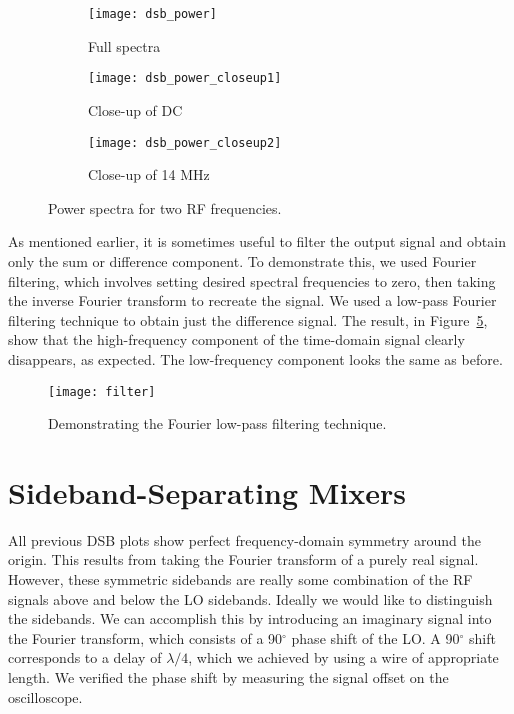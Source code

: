 \documentclass[12pt]{article}
\newcommand{\degree}{\ensuremath{^\circ} }
\begin{document}
\begin{figure}[h]
    \centering
    \begin{subfigure}[b]{0.3\textwidth}
        \texttt{[image: dsb\_power]}
        \caption{Full spectra}
        \label{fig:dsb_power}
    \end{subfigure}
    \quad
    \begin{subfigure}[b]{0.3\textwidth}
        \texttt{[image: dsb\_power\_closeup1]}
        \caption{Close-up of DC}
        \label{fig:dsb_power_closeup1}
    \end{subfigure}
    \begin{subfigure}[b]{0.3\textwidth}
        \texttt{[image: dsb\_power\_closeup2]}
        \caption{Close-up of 14 MHz}
        \label{fig:dsb_power_closeup2}
    \end{subfigure}
    \caption{Power spectra for two RF frequencies.}
\end{figure}

As mentioned earlier, it is sometimes useful to filter the output signal and obtain only the sum or difference component.
To demonstrate this, we used Fourier filtering, which involves setting desired spectral frequencies to zero, then taking the inverse Fourier transform to recreate the signal.
We used a low-pass Fourier filtering technique to obtain just the difference signal.
The result, in Figure~\ref{fig:filter}, show that the high-frequency component of the time-domain signal clearly disappears, as expected.
The low-frequency component looks the same as before.

\begin{figure}
\centering
\texttt{[image: filter]}
\caption{Demonstrating the Fourier low-pass filtering technique.}
\label{fig:filter}
\end{figure}

\section{Sideband-Separating Mixers}
All previous DSB plots show perfect frequency-domain symmetry around the origin.
This results from taking the Fourier transform of a purely real signal.
However, these symmetric sidebands are really some combination of the RF signals above and below the LO sidebands. 
Ideally we would like to distinguish the sidebands.
We can accomplish this by introducing an imaginary signal into the Fourier transform, which consists of a 90\degree phase shift of the LO.
A 90\degree shift corresponds to a delay of $\lambda/4$, which we achieved by using a wire of appropriate length.
We verified the phase shift by measuring the signal offset on the oscilloscope.
\end{document}
